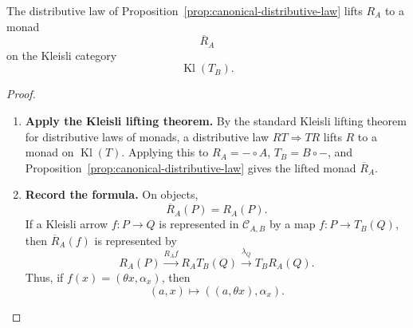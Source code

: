 \begin{corollary}
\label{cor:lifted-input-monad}
    The distributive law of Proposition~\ref{prop:canonical-distributive-law} lifts \(R_A\) to a monad
    \[
        \overline R_A
    \]
    on the Kleisli category
    \[
        \operatorname{Kl}(T_B).
    \]
\end{corollary}
\begin{proof}
    \leavevmode
    \begin{enumerate}
        \item \textbf{Apply the Kleisli lifting theorem.} By the standard Kleisli lifting theorem for distributive laws of monads, a distributive law \(RT\Rightarrow TR\) lifts \(R\) to a monad on \(\operatorname{Kl}(T)\). Applying this to \(R_A=-\circ A\), \(T_B=B\circ-\), and Proposition~\ref{prop:canonical-distributive-law} gives the lifted monad \(\overline R_A\).

        \item \textbf{Record the formula.} On objects,
        \[
            \overline R_A(P)=R_A(P).
        \]
        If a Kleisli arrow \(f:P\to Q\) is represented in \(\mathcal C_{A,B}\) by a map \(f:P\to T_B(Q)\), then \(\overline R_A(f)\) is represented by
        \[
            R_A(P)
            \xrightarrow{R_A f}
            R_AT_B(Q)
            \xrightarrow{\lambda_Q}
            T_BR_A(Q).
        \]
        Thus, if \(f(x)=(\theta x,\alpha_x)\), then
        \[
            (a,x)
            \longmapsto
            ((a,\theta x),\alpha_x).
        \]
    \end{enumerate}
\end{proof}

